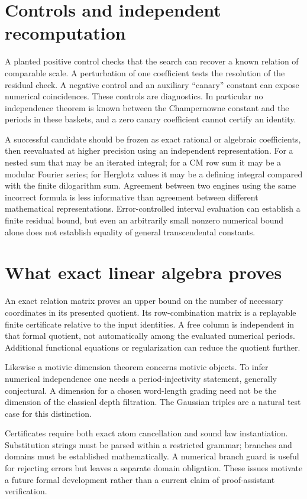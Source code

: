 \section{Controls and independent recomputation}
A planted positive control checks that the search can recover a known
relation of comparable scale. A perturbation of one coefficient tests the
resolution of the residual check. A negative control and an auxiliary
``canary'' constant can expose numerical coincidences. These controls are
diagnostics. In particular no independence theorem is known between the
Champernowne constant and the periods in these baskets, and a zero canary
coefficient cannot certify an identity.

A successful candidate should be frozen as exact rational or algebraic
coefficients, then reevaluated at higher precision using an independent
representation. For a nested sum that may be an iterated integral; for a
CM row sum it may be a modular Fourier series; for Herglotz values it may
be a defining integral compared with the finite dilogarithm sum.
Agreement between two engines using the same incorrect formula is less
informative than agreement between different mathematical representations.
Error-controlled interval evaluation can establish a finite residual
bound, but even an arbitrarily small nonzero numerical bound alone does
not establish equality of general transcendental constants.

\section{What exact linear algebra proves}
An exact relation matrix proves an upper bound on the number of necessary
coordinates in its presented quotient. Its row-combination matrix is a
replayable finite certificate relative to the input identities. A free
column is independent in that formal quotient, not automatically among
the evaluated numerical periods. Additional functional equations or
regularization can reduce the quotient further.

Likewise a motivic dimension theorem concerns motivic objects. To infer
numerical independence one needs a period-injectivity statement, generally
conjectural. A dimension for a chosen word-length grading need not be the
dimension of the classical depth filtration. The Gaussian triples are a
natural test case for this distinction.

Certificates require both exact atom cancellation and sound law
instantiation. Substitution strings must be parsed within a restricted
grammar; branches and domains must be established mathematically. A
numerical branch guard is useful for rejecting errors but leaves a
separate domain obligation. These issues motivate a future formal
development rather than a current claim of proof-assistant verification.

